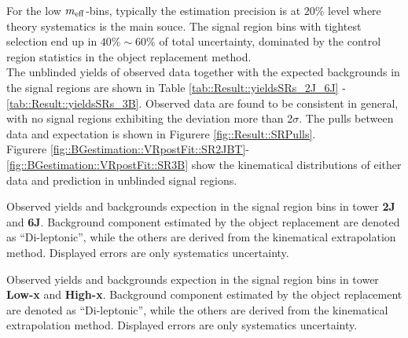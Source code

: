 For the low $m_{\mathrm{eff}}$-bins, typically the estimation precision is at $20\%$ level where theory systematics is the main souce.
The signal region bins with tightest selection end up in $40\% \sim 60\%$ of total uncertainty, dominated by the control region statistics in the object replacement method. \\

The unblinded yields of observed data together with the expected backgrounds in the signal regions are shown in Table \ref{tab::Result::yieldsSRs_2J_6J} - \ref{tab::Result::yieldsSRs_3B}. Observed data are found to be consistent in general, with no signal regions exhibiting the deviation more than 2$\sigma$.
The pulls between data and expectation is shown in Figurere \ref{fig::Result::SRPulls}. \\

Figurere \ref{fig::BGestimation::VRpostFit::SR2JBT}-\ref{fig::BGestimation::VRpostFit::SR3B} show the kinematical distributions of either data and prediction in unblinded signal regions.  \\


\begin{table}
  \begin{center}
    \caption{
        Observed yields and backgrounds expection in the signal region bins in tower \textbf{2J} and \textbf{6J}.
        Background component estimated by the object replacement are denoted as ``Di-leptonic'', 
        while the others are derived from the kinematical extrapolation method. Displayed errors are only systematics uncertainty.
    \label{tab::Result::yieldsSRs_2J_6J}}
    
    
  \end{center}
\end{table}

\begin{table}
  \begin{center}
    \caption{
        Observed yields and backgrounds expection in the signal region bins in tower \textbf{Low-x} and \textbf{High-x}.
        Background component estimated by the object replacement are denoted as ``Di-leptonic'', 
        while the others are derived from the kinematical extrapolation method. Displayed errors are only systematics uncertainty.
    \label{tab::Result::yieldsSRs_Lowx_Highx}}
    
    
  \end{center}
\end{table}

